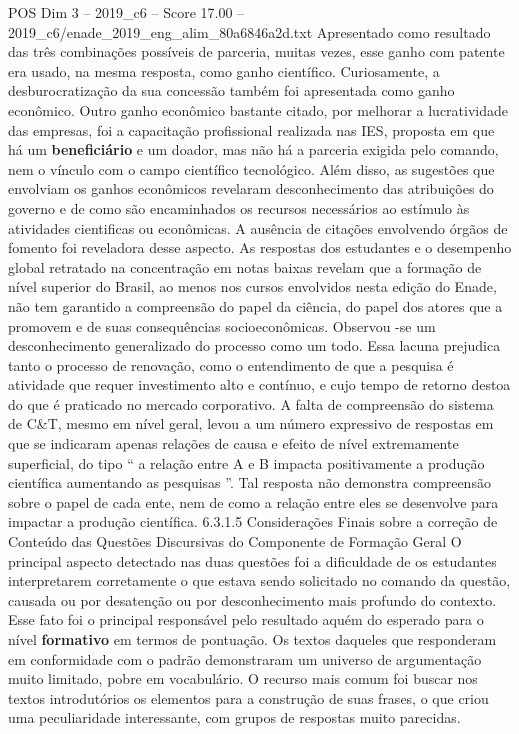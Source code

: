\begin{textsample}{POS Dim 3 – 2019\_c6 – Score 17.00 – 2019\_c6/enade\_2019\_eng\_alim\_80a6846a2d.txt}
Apresentado como resultado das três combinações possíveis de parceria, muitas vezes, esse ganho com patente era usado, na mesma resposta, como ganho científico.
Curiosamente, a desburocratização da sua concessão também foi apresentada como ganho econômico.
Outro ganho econômico bastante citado, por melhorar a lucratividade das empresas, foi a capacitação profissional realizada nas IES, proposta em que há um \textbf{beneficiário} e um doador, mas não há a parceria exigida pelo comando, nem o vínculo com o campo científico tecnológico.
Além disso, as sugestões que envolviam os ganhos econômicos revelaram desconhecimento das atribuições do governo e de como são encaminhados os recursos necessários ao estímulo às atividades cientificas ou econômicas.
A ausência de citações envolvendo órgãos de fomento foi reveladora desse aspecto.
As respostas dos estudantes e o desempenho global retratado na concentração em notas baixas revelam que a formação de nível superior do Brasil, ao menos nos cursos envolvidos nesta edição do Enade, não tem garantido a compreensão do papel da ciência, do papel dos atores que a promovem e de suas consequências socioeconômicas.
Observou -se um desconhecimento generalizado do processo como um todo.
Essa lacuna prejudica tanto o processo de renovação, como o entendimento de que a pesquisa é atividade que requer investimento alto e contínuo, e cujo tempo de retorno destoa do que é praticado no mercado corporativo.
A falta de compreensão do sistema de C\&T, mesmo em nível geral, levou a um número expressivo de respostas em que se indicaram apenas relações de causa e efeito de nível extremamente superficial, do tipo “ a relação entre A e B impacta positivamente a produção científica aumentando as pesquisas ”.
Tal resposta não demonstra compreensão sobre o papel de cada ente, nem de como a relação entre eles se desenvolve para impactar a produção científica. 6.3.1.5 Considerações Finais sobre a correção de Conteúdo das Questões Discursivas do Componente de Formação Geral O principal aspecto detectado nas duas questões foi a dificuldade de os estudantes interpretarem corretamente o que estava sendo solicitado no comando da questão, causada ou por desatenção ou por desconhecimento mais profundo do contexto.
Esse fato foi o principal responsável pelo resultado aquém do esperado para o nível \textbf{formativo} em termos de pontuação.
Os textos daqueles que responderam em conformidade com o padrão demonstraram um universo de argumentação muito limitado, pobre em vocabulário.
O recurso mais comum foi buscar nos textos introdutórios os elementos para a construção de suas frases, o que criou uma peculiaridade interessante, com grupos de respostas muito parecidas.

\end{textsample}
